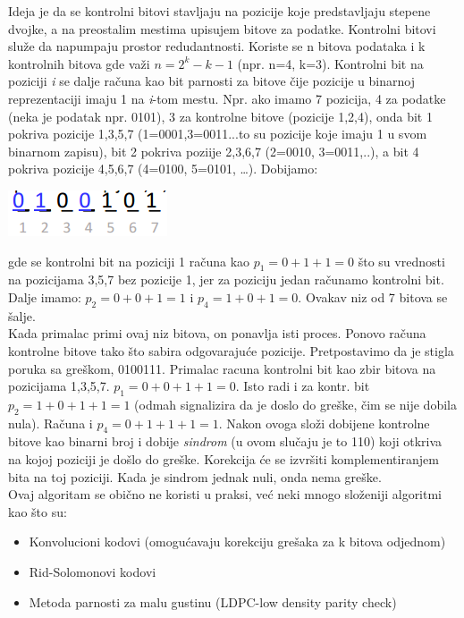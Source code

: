 \documentclass{article} %
\begin{document}
Ideja je da se kontrolni bitovi stavljaju na pozicije koje predstavljaju stepene dvojke, a na preostalim mestima upisujem bitove za podatke. Kontrolni bitovi služe da napumpaju prostor redudantnosti. Koriste se n bitova podataka i k kontrolnih bitova gde važi $n = 2^{k}-k-1$ (npr. n=4, k=3). Kontrolni bit na poziciji \textit{i} se dalje računa kao bit parnosti za bitove čije pozicije u binarnoj reprezentaciji imaju 1 na \textit{i}-tom mestu. Npr. ako imamo 7 pozicija, 4 za podatke (neka je podatak npr. 0101), 3 za kontrolne bitove (pozicije 1,2,4), onda bit 1 pokriva pozicije 1,3,5,7 (1=0001,3=0011...to su pozicije koje imaju 1 u svom binarnom zapisu), bit 2 pokriva poziije 2,3,6,7 (2=0010, 3=0011,..), a bit 4 pokriva pozicije 4,5,6,7 (4=0100, 5=0101, …). Dobijamo:
\begin{center}
	\includegraphics[scale=0.5]{korek}
\end{center}
gde se kontrolni bit na poziciji 1 računa kao $ p_{1} = 0+1+1 = 0$ što su vrednosti na pozicijama 3,5,7 bez pozicije 1, jer za poziciju jedan računamo kontrolni bit. Dalje imamo: $ p_{2} = 0+0+1 = 1$ i $ p_{4} = 1+0+1 = 0$. Ovakav niz od 7 bitova se šalje.\\

Kada primalac primi ovaj niz bitova, on ponavlja isti proces. Ponovo računa kontrolne bitove tako što sabira odgovarajuće pozicije. Pretpostavimo da je stigla poruka sa greškom, 0100111. Primalac racuna kontrolni bit kao zbir bitova na pozicijama 1,3,5,7. $ p_{1} = 0+0+1+1 = 0$. Isto radi i za kontr. bit $ p_{2} = 1+0+1+1 = 1$ (odmah signalizira da je doslo do greške, čim se nije dobila nula). Računa i $ p_{4} = 0+1+1+1 = 1$. Nakon ovoga složi dobijene kontrolne bitove kao binarni broj i dobije \textit{sindrom} (u ovom slučaju je to 110) koji otkriva na kojoj poziciji je došlo do greške. Korekcija će se izvršiti komplementiranjem bita na toj poziciji. Kada je sindrom jednak nuli, onda nema greške.\\

Ovaj algoritam se obično ne koristi u praksi, već neki mnogo složeniji algoritmi kao što su:
\begin{itemize}
  \item Konvolucioni kodovi (omogućavaju korekciju grešaka za k bitova odjednom)
  \item Rid-Solomonovi kodovi
  \item Metoda parnosti za malu gustinu (LDPC-low density parity check) 
\end{itemize}
\end{document}
